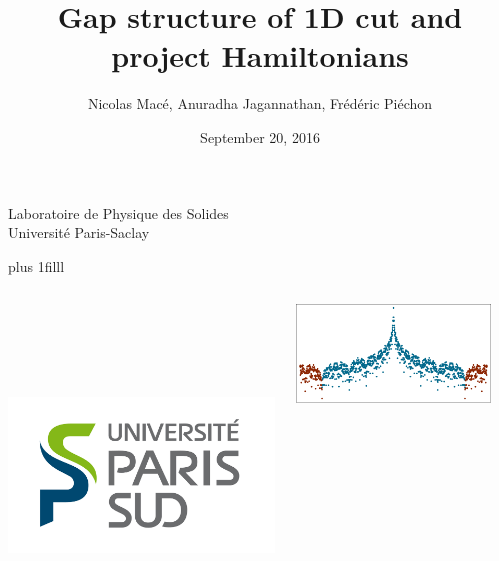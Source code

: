 \documentclass[xcolor=x11names,compress,professionalfonts]{beamer}
\newcommand{\btVFill}{\vskip0pt plus 1filll}%
\renewcommand{\(}{\begin{columns}}
\renewcommand{\)}{\end{columns}}
\newcommand{\<}[1]{\begin{column}{#1}}
\renewcommand{\>}{\end{column}}
\begin{document}
\begin{frame}
\title{{\fontsize{14}{60}\selectfont Gap structure of 1D cut and project Hamiltonians}}

\author{Nicolas Macé, Anuradha Jagannathan, Frédéric Piéchon}

\institute %
{
  Laboratoire de Physique des Solides\\
  Université Paris-Saclay
}

\date{September 20, 2016}

\titlepage

\btVFill
\begin{columns}
\begin{column}{2cm}
~\\
~\\
~\\
~\\
\raggedright
\includegraphics[scale=.15]{img/LogoUPSUD.png}
\end{column}
\begin{column}{6cm}
\centering
\includegraphics[width=1.\textwidth]{img/cover_illustration.pdf}
\end{column}
\begin{column}{2cm}

\end{column}
\end{columns}
\end{frame}
\end{document}
